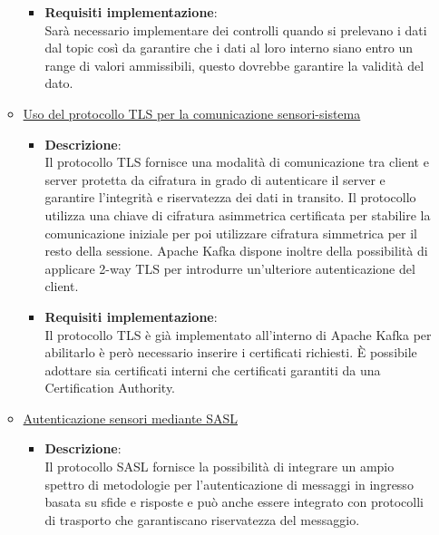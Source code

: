 \documentclass[10pt]{article}
\begin{document}
\begin{itemize}
\begin{itemize}
\begin{itemize}
                    \item \textbf{Requisiti implementazione}:\\
                    Sarà necessario implementare dei controlli quando si prelevano i dati dal topic così da garantire che i dati al loro interno siano entro un range di valori ammissibili, questo dovrebbe garantire la validità del dato.

                \end{itemize}

                \item \underline{Uso del protocollo TLS per la comunicazione sensori-sistema}
                \begin{itemize}
                    \item \textbf{Descrizione}:\\
                    Il protocollo TLS fornisce una modalità di comunicazione tra client e server protetta da cifratura
                    in grado di autenticare il server e garantire l'integrità e riservatezza dei dati in transito.
                    Il protocollo utilizza una chiave di cifratura asimmetrica certificata per stabilire la comunicazione iniziale
                    per poi utilizzare cifratura simmetrica per il resto della sessione.
                    Apache Kafka dispone inoltre della possibilità di applicare 2-way TLS per introdurre un'ulteriore autenticazione del client.

                    \item \textbf{Requisiti implementazione}:\\
                    Il protocollo TLS è già implementato all'interno di Apache Kafka per abilitarlo è però necessario inserire i certificati richiesti.
                    È possibile adottare sia certificati interni che certificati garantiti da una Certification Authority.

                \end{itemize}

                \item \underline{Autenticazione sensori mediante SASL}
                \begin{itemize}
                    \item \textbf{Descrizione}:\\
                    Il protocollo SASL fornisce la possibilità di integrare un ampio spettro di metodologie per l'autenticazione di messaggi in ingresso basata su sfide e risposte e
                    può anche essere integrato con protocolli di trasporto che garantiscano riservatezza del messaggio.


\end{itemize}
\end{itemize}
\end{itemize}
\end{document}
